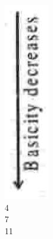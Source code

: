 \documentclass[10pt]{article}
\begin{document}
\includegraphics[max width=\textwidth, center]{2025_01_28_8470952b98110cec3aabg-078(1)}\\
4\\
7\\
11
\end{document}
